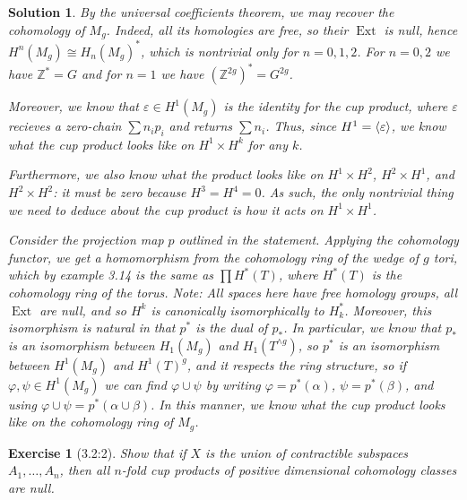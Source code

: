 \documentclass{article}
\theoremstyle{plain}
\newtheorem*{ex}{Exercise}
\theoremstyle{nonumberplain}
\newtheorem{sol}{Solution}
\newcommand{\Z}{\mathbb{Z}}
\DeclareMathOperator{\Ext}{Ext}
\DeclarePairedDelimiter{\braket}{\langle}{\rangle}
\begin{document}
\begin{sol}
By the universal coefficients theorem, we may recover the cohomology of $M_g$. Indeed, all its homologies are free, so their $\Ext$ is null, hence $H^n(M_g) \cong H_n(M_g)^*$, which is nontrivial only for $n = 0, 1, 2$. For $n = 0, 2$ we have $\Z^* = G$ and for $n = 1$ we have $(\Z^{2g})^* = G^{2g}$.

Moreover, we know that $\varepsilon \in H^1(M_g)$ is the identity for the cup product, where $\varepsilon$ recieves a zero-chain $\sum n_i p_i$ and returns $\sum n_i$. Thus, since $H^1 = \braket{\varepsilon}$, we know what the cup product looks like on $H^1 \times H^k$ for any $k$.

Furthermore, we also know what the product looks like on $H^1 \times H^2$, $H^2 \times H^1$, and $H^2  \times H^2$: it must be zero because $H^3 = H^4 = 0$. As such, the only nontrivial thing we need to deduce about the cup product is how it acts on $H^1 \times H^1$.

Consider the projection map $p$ outlined in the statement. Applying the cohomology functor, we get a homomorphism from the cohomology ring of the wedge of $g$ tori, which by example 3.14 is the same as $\prod H^*(T)$, where $H^*(T)$ is the cohomology ring of the torus. Note: All spaces here have free homology groups, all $\Ext$ are null, and so $H^k$ is canonically isomorphically to $H_k^*$. Moreover, this isomorphism is natural in that $p^*$ is the dual of $p_*$. In particular, we know that $p_*$ is an isomorphism between $H_1(M_g)$ and $H_1(T^{\wedge g})$, so $p^*$ is an isomorphism between $H^1(M_g)$ and $H^1(T)^g$, and it respects the ring structure, so if $\varphi, \psi \in H^1(M_g)$ we can find $\varphi \cup \psi$ by writing $\varphi = p^*(\alpha)$, $\psi = p^*(\beta)$, and using $\varphi \cup \psi = p^*(\alpha \cup \beta)$. In this manner, we know what the cup product looks like on the cohomology ring of $M_g$.
\end{sol}

\begin{ex}[3.2:2]
Show that if $X$ is the union of contractible subspaces $A_1, \dots, A_n$, then all $n$-fold cup products of positive dimensional cohomology classes are null.
\end{ex}
\end{document}
